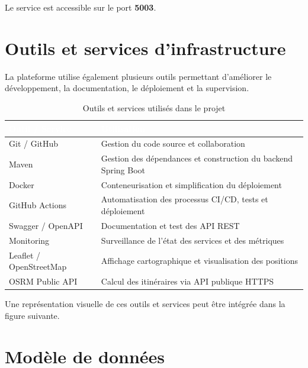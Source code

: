 \documentclass[12pt,a4paper]{report}
\newcommand{\thead}[1]{\cellcolor{tablehead}\textcolor{white}{\textbf{#1}}}
\begin{document}
Le service est accessible sur le port \textbf{5003}.

\section{Outils et services d'infrastructure}
\label{sec:ch2-outils}

La plateforme utilise également plusieurs outils permettant d'améliorer le
développement, la documentation, le déploiement et la supervision.

\begin{table}[H]
  \centering
  \caption{Outils et services utilisés dans le projet}
  \label{tab:outils_services}
  \begin{tabularx}{\textwidth}{|l|Y|}
    \hline
    \thead{Outil / Service} & \thead{Utilisation} \\
    \hline
    Git / GitHub &
    Gestion du code source et collaboration \\
    \hline
    Maven &
    Gestion des dépendances et construction du backend Spring Boot \\
    \hline
    Docker &
    Conteneurisation et simplification du déploiement \\
    \hline
    GitHub Actions &
    Automatisation des processus CI/CD, tests et déploiement \\
    \hline
    Swagger / OpenAPI &
    Documentation et test des API REST \\
    \hline
    Monitoring &
    Surveillance de l'état des services et des métriques \\
    \hline
    Leaflet / OpenStreetMap &
    Affichage cartographique et visualisation des positions \\
    \hline
    OSRM Public API &
    Calcul des itinéraires via API publique HTTPS \\
    \hline
  \end{tabularx}
\end{table}

Une représentation visuelle de ces outils et services peut être intégrée
dans la figure suivante.



\section{Modèle de données}
\label{sec:ch2-modele-donnees}
\end{document}
